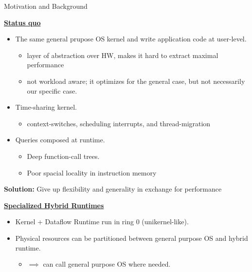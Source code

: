 \begin{block}{Motivation and Background}

\underline{\textbf{Status quo}}
  \begin{itemize}
  \item The same general prupose OS kernel and write application code at user-level.
    \begin{itemize}
    \item layer of abstraction over HW, makes it hard to extract maximal performance
    \item not workload aware; it optimizes for the general case, but not necessarily our specific case.
    \end{itemize}
 
  \item Time-sharing kernel.
    \begin{itemize}
    \item context-switches, scheduling interrupts, and thread-migration
    \end{itemize}
  
  \item Queries composed at runtime.
    \begin{itemize}
    \item Deep function-call trees.
    \item Poor spacial locality in instruction memory
    \end{itemize}
  \end{itemize}

  \begin{center}
    \alert{\textbf{Solution:} Give up flexibility and generality in exchange for performance}
  \end{center}
   
  \underline{\textbf{Specialized Hybrid Runtimes}}
    \begin{itemize}
    \item Kernel + Dataflow Runtime run in ring 0 (unikernel-like).
    \item Physical resources can be partitioned between general purpose OS and hybrid runtime\cite{KOCOLOSKI:2015:PISCES}.
      \begin{itemize}
      \item $\implies$ can call general purpose OS where needed.
      \end{itemize}


\end{itemize}
\end{block}
